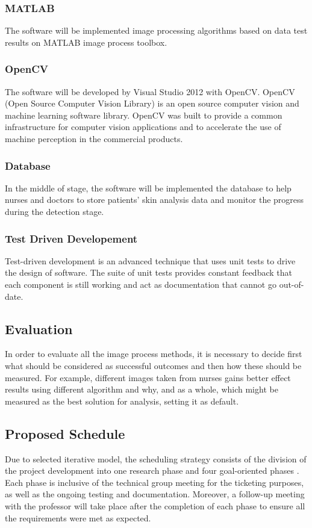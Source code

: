 \begin{itemize}
\subsubsection{MATLAB}
The software will be implemented image processing algorithms based on data test results on MATLAB image process toolbox.

\subsubsection{OpenCV}
The software will be developed by Visual Studio 2012 with OpenCV. OpenCV (Open Source Computer Vision Library) is an open source computer vision and machine learning software library. OpenCV was built to provide a common infrastructure for computer vision applications and to accelerate the use of machine perception in the commercial products.

\subsubsection{Database}
In the middle of stage, the software will be implemented the database to help nurses and doctors to store patients' skin analysis data and monitor the progress during the detection stage.

\subsubsection{Test Driven Developement}
Test-driven development is an advanced technique that uses unit tests to drive the design of software. The suite of unit tests provides constant feedback that each component is still working and act as documentation that cannot go out-of-date.


\subsection{Evaluation}
In order to evaluate all the image process methods, it is necessary to decide
first what should be considered as successful outcomes and then how
these should be measured. For example, different images taken from nurses gains better effect results using different algorithm and why, and as a whole, which might be
measured as the best solution for analysis, setting it as default.

\subsection{Proposed Schedule}
Due to selected iterative model, the scheduling strategy consists of the division of the project development into one research phase and four goal-oriented phases \cite{Hardeep}. Each phase is inclusive of the technical group meeting for the ticketing purposes, as well as the ongoing testing and documentation. Moreover, a follow-up meeting with the professor will take place after the completion of each phase to ensure all the requirements were met as expected.\\


\end{itemize}
